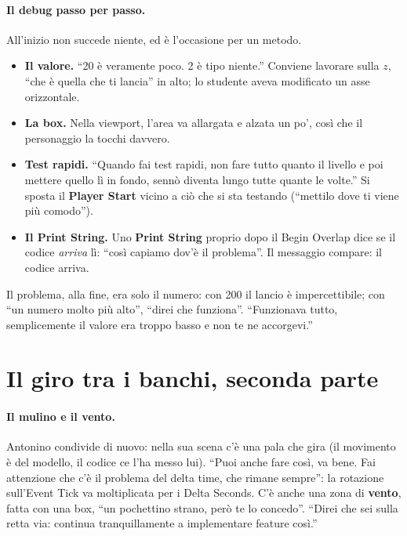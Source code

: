 \paragraph{Il debug passo per passo.} All'inizio non succede niente, ed è
l'occasione per un metodo.
\begin{itemize}
  \item \textbf{Il valore.} ``20 è veramente poco. 2 è tipo niente.'' Conviene
        lavorare sulla \textbf{$z$}, ``che è quella che ti lancia'' in alto;
        lo studente aveva modificato un asse orizzontale.
  \item \textbf{La box.} Nella viewport, l'area va allargata e alzata un
        po', così che il personaggio la tocchi davvero.
  \item \textbf{Test rapidi.} ``Quando fai test rapidi, non fare tutto quanto
        il livello e poi mettere quello lì in fondo, sennò diventa lungo tutte
        quante le volte.'' Si sposta il \textbf{Player Start} vicino a ciò che
        si sta testando (``mettilo dove ti viene più comodo'').
  \item \textbf{Il Print String.} Uno \textbf{Print String} proprio dopo il
        Begin Overlap dice se il codice \emph{arriva} lì: ``così capiamo dov'è
        il problema''. Il messaggio compare: il codice arriva.
\end{itemize}
Il problema, alla fine, era solo il numero: con 200 il lancio è impercettibile;
con ``un numero molto più alto'', ``direi che funziona''. ``Funzionava tutto,
semplicemente il valore era troppo basso e non te ne accorgevi.''

\section{Il giro tra i banchi, seconda parte}
\label{gd12:sec:giro2}

\paragraph{Il mulino e il vento.} Antonino condivide di nuovo: nella sua scena
c'è una pala che gira (il movimento è del modello, il codice ce l'ha messo lui).
``Puoi anche fare così, va bene. Fai attenzione che c'è il problema del delta
time, che rimane sempre'': la rotazione sull'Event Tick va moltiplicata per i
Delta Seconds. C'è anche una zona di \textbf{vento}, fatta con una box,
``un pochettino strano, però te lo concedo''. ``Direi che sei sulla retta via:
continua tranquillamente a implementare feature così.''


